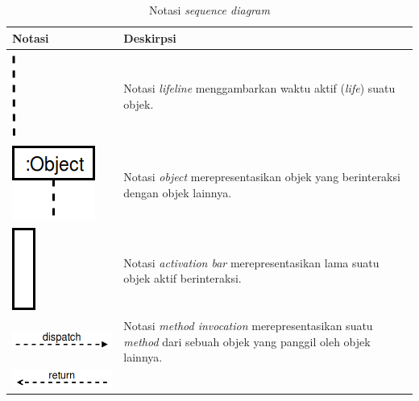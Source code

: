 \begin{longtable}{|>{\centering}m{5cm}|m{7cm}|}
  \caption{Notasi \emph{sequence diagram}}\label{tab:notasi-sequence-diagram}\\
  \hline \textbf{Notasi} & \textbf{Deskirpsi} \\\hline
  \includegraphics[width=.007\linewidth]{img/uml-notation/lifeline}
                         & Notasi \emph{lifeline} menggambarkan waktu
                           aktif (\emph{life}) suatu objek.\\\hline
  \includegraphics[width=.2\linewidth]{img/uml-notation/objek}
                         & Notasi \emph{object} merepresentasikan objek
                           yang berinteraksi dengan objek lainnya. \\\hline
  \includegraphics[width=.04\linewidth]{img/uml-notation/activation-bar}
                         &Notasi \emph{activation bar}
                           merepresentasikan lama suatu objek aktif
                           berinteraksi.\\\hline
  \includegraphics[width=.6\linewidth]{img/uml-notation/invoke}
                         & Notasi \emph{method invocation}
                           merepresentasikan suatu \emph{method} dari
                           sebuah objek yang panggil oleh objek
                           lainnya.\\\hline
  \includegraphics[width=.6\linewidth]{img/uml-notation/return}

\end{longtable}
